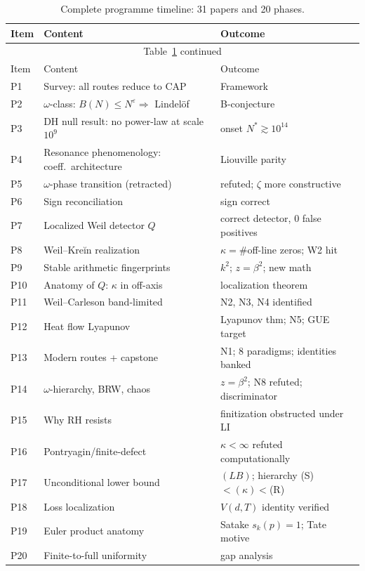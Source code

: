 \documentclass[11pt]{amsart}
\theoremstyle{definition}
\theoremstyle{remark}
\newcommand{\om}{\omega}
\newcommand{\kap}{\kappa}
\newcommand{\eps}{\varepsilon}
\begin{document}
\begin{longtable}{lll}
\caption{Complete programme timeline: 31 papers and 20 phases.}\label{tab:timeline}\\
\toprule
Item & Content & Outcome \\
\midrule
\endfirsthead
\multicolumn{3}{c}{Table~\ref{tab:timeline} continued}\\
\toprule
Item & Content & Outcome \\
\midrule
\endhead
\bottomrule
\endfoot
P1 & Survey: all routes reduce to CAP & Framework \\
P2 & $\om$-class: $B(N)\le N^\eps\Rightarrow$ Lindel\"of & B-conjecture \\
P3 & DH null result: no power-law at scale $10^9$ & onset $N^*\gtrsim 10^{14}$ \\
P4 & Resonance phenomenology: coeff.\ architecture & Liouville parity \\
P5 & $\om$-phase transition (retracted) & refuted; $\zeta$ more constructive \\
P6 & Sign reconciliation & sign correct \\
P7 & Localized Weil detector $Q$ & correct detector, 0 false positives \\
P8 & Weil--Kreĭn realization & $\kap = \#$off-line zeros; W2 hit \\
P9 & Stable arithmetic fingerprints & $k^2$; $z=\beta^2$; new math \\
P10 & Anatomy of $Q$: $\kap$ in off-axis & localization theorem \\
P11 & Weil--Carleson band-limited & N2, N3, N4 identified \\
P12 & Heat flow Lyapunov & Lyapunov thm; N5; GUE target \\
P13 & Modern routes + capstone & N1; 8 paradigms; identities banked \\
P14 & $\om$-hierarchy, BRW, chaos & $z=\beta^2$; N8 refuted; discriminator \\
P15 & Why RH resists & finitization obstructed under LI \\
P16 & Pontryagin/finite-defect & $\kap<\infty$ refuted computationally \\
P17 & Unconditional lower bound & $(LB)$; hierarchy (S)$<(\kap)<$(R) \\
P18 & Loss localization & $V(d,T)$ identity verified \\
P19 & Euler product anatomy & Satake $s_k(p)=1$; Tate motive \\
P20 & Finite-to-full uniformity & gap analysis \\

\end{longtable}
\end{document}
